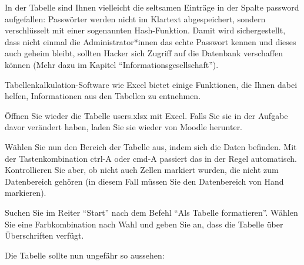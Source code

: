In der Tabelle sind Ihnen vielleicht die seltsamen Einträge in der Spalte password aufgefallen: Passwörter werden nicht im Klartext abgespeichert, sondern verschlüsselt mit einer sogenannten Hash-Funktion. Damit wird sichergestellt, dass nicht einmal die Administrator*innen das echte Passwort kennen und dieses auch geheim bleibt, sollten Hacker sich Zugriff auf die Datenbank verschaffen können (Mehr dazu im Kapitel \enquote{Informationsgesellschaft}).

Tabellenkalkulation-Software wie Excel bietet einige Funktionen, die Ihnen dabei helfen, Informationen aus den Tabellen zu entnehmen.

\begin{myexercise}
  \label{myexercise:tabellenformatExcel}
    Öffnen Sie wieder die Tabelle users.xlsx mit Excel. Falls Sie sie in der Aufgabe davor verändert haben, laden Sie sie wieder von Moodle herunter.

    Wählen Sie nun den Bereich der Tabelle aus, indem sich die Daten befinden. Mit der Tastenkombination ctrl-A oder cmd-A passiert das in der Regel automatisch. Kontrollieren Sie aber, ob nicht auch Zellen markiert wurden, die nicht zum Datenbereich gehören (in diesem Fall müssen Sie den Datenbereich von Hand markieren).

    Suchen Sie im Reiter \enquote{Start} nach dem Befehl \enquote{Als Tabelle formatieren}. Wählen Sie eine Farbkombination nach Wahl und geben Sie an, dass die Tabelle über Überschriften verfügt.

    Die Tabelle sollte nun ungefähr so aussehen:
    \begin{figure}[H]
      \centering
    \end{figure}


\end{myexercise}
